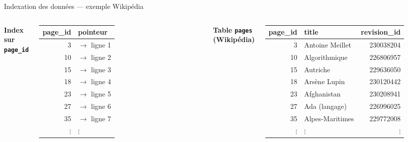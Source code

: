 \documentclass[a4paper,12pt]{beamer}
\begin{document}
\begin{frame}{Indexation des données — exemple Wikipédia}
\small

\begin{columns}[T]

\centering
{\scriptsize\textbf{Index sur \texttt{page\_id}}}\\[4pt]

\scriptsize
\setlength{\tabcolsep}{5pt}
\begin{tabular}{r l}
  \textbf{page\_id} & \textbf{pointeur} \\
  \hline
  3  & $\rightarrow$ ligne 1 \\
  10 & $\rightarrow$ ligne 2 \\
  \rowcolor{blue!10}
  15 & $\rightarrow$ ligne 3 \\
  \rowcolor{blue!10}
  18 & $\rightarrow$ ligne 4 \\
  \rowcolor{blue!10}
  23 & $\rightarrow$ ligne 5 \\
  27 & $\rightarrow$ ligne 6 \\
  35 & $\rightarrow$ ligne 7 \\
  $\vdots$ & $\vdots$ \\
\end{tabular}

\centering
{\scriptsize\textbf{Table \texttt{pages} (Wikipédia)}}\\[4pt]

\scriptsize
\setlength{\tabcolsep}{4pt}
\begin{tabular}{r l r}
  \textbf{page\_id} & \textbf{title} & \textbf{revision\_id} \\
  \hline
  3  & Antoine Meillet  & 230038204 \\
  10 & Algorithmique    & 226806957 \\
  \rowcolor{blue!10}
  15 & Autriche         & 229636050 \\
  \rowcolor{blue!10}
  18 & Arsène Lupin     & 230120442 \\
  \rowcolor{blue!10}
  23 & Afghanistan      & 230208941 \\
  27 & Ada (langage)    & 226996025 \\
  35 & Alpes-Maritimes  & 229772008 \\
  $\vdots$ & $\vdots$ & $\vdots$ \\
\end{tabular}


\end{columns}
\end{frame}
\end{document}

